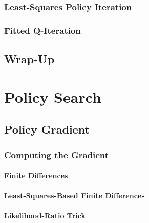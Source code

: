         \subsection{Least-Squares Policy Iteration} %

        \subsection{Fitted Q-Iteration} %

    \section{Wrap-Up} %

\chapter{Policy Search} %

    \section{Policy Gradient} %

        \subsection{Computing the Gradient} %

            \subsubsection{Finite Differences} %

            \subsubsection{Least-Squares-Based Finite Differences} %

            \subsubsection{Likelihood-Ratio Trick} %


